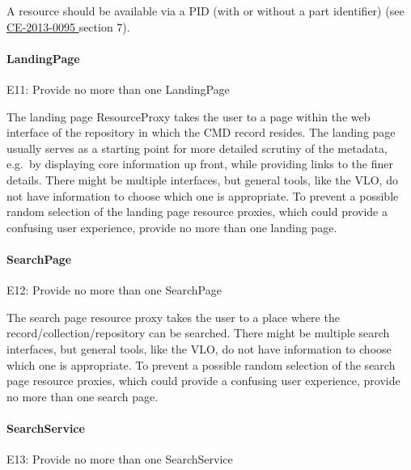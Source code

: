 A resource should be available via a PID (with or without a part identifier) (see
\href{http://hdl.handle.net/1839/00-DOCS.CLARIN.EU-78}{CE-2013-0095 \cite{ce20130095}} section 7).

\paragraph{LandingPage}\label{landingpage}

\label{e11}
E11: Provide no more than one LandingPage


The landing page ResourceProxy takes the user to a page within the web interface of the repository in which the CMD record resides. The landing page usually serves as a starting point for more detailed scrutiny of the metadata, e.g.~by displaying core information up front, while providing links to the finer details. There might be multiple interfaces, but general tools, like the VLO, do not have information to choose which one is appropriate. To prevent a possible random selection
of the landing page resource proxies, which could provide a confusing user experience, provide no more than one landing page.

\paragraph{SearchPage}\label{searchpage}

E12: Provide no more than one SearchPage


The search page resource proxy takes the user to a place where the record/collection/repository can be searched. There might be multiple search interfaces, but general tools, like the VLO, do not have information to choose which one is appropriate. To prevent a possible random selection of the search page resource proxies, which could provide a confusing user experience, provide no more than one search page.

\paragraph{SearchService}\label{searchservice}

E13: Provide no more than one SearchService


